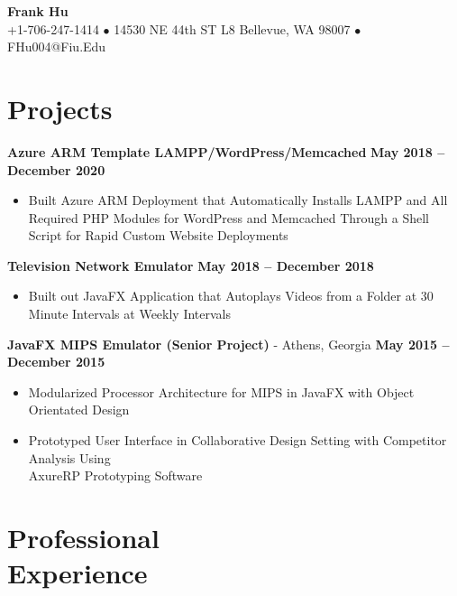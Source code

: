 \documentclass[margin,line]{resume}
\begin{document}
	{\centering \LARGE{\textbf{Frank Hu}}}
	\\
	\normalsize
	+1-706-247-1414 $\bullet$ 14530 NE 44th ST L8 Bellevue, WA 98007 $\bullet$ FHu004@Fiu.Edu
	
	\begin{resume}	
		
	
	\section{\mysidestyle Projects}
	
	\textbf{Azure ARM Template LAMPP/WordPress/Memcached}  \hfill \textbf{May 2018 -- December 2020}
	\vspace{1mm}
	\begin{itemize}
		\item Built Azure ARM Deployment that Automatically Installs LAMPP and All Required PHP Modules for WordPress and Memcached Through a Shell Script for Rapid Custom Website Deployments
	\end{itemize}
	
	\textbf{Television Network Emulator}  \hfill \textbf{May 2018 -- December 2018}
	\vspace{1mm}
	\begin{itemize}
		\item Built out JavaFX Application that Autoplays Videos from a Folder at 30 Minute Intervals at Weekly Intervals
	\end{itemize}
	
	\textbf{JavaFX MIPS Emulator (Senior Project)} - Athens, Georgia \vspace{1mm} \hfill \textbf{May 2015 -- December 2015}
	\begin{itemize} 
		\item Modularized Processor Architecture for MIPS in JavaFX with Object Orientated Design
		\item Prototyped User Interface in Collaborative Design Setting with Competitor Analysis Using \\
		AxureRP Prototyping Software  
	\end{itemize}
	
		
		
	\section{\mysidestyle Professional\\Experience}
	

\end{resume}
\end{document}

